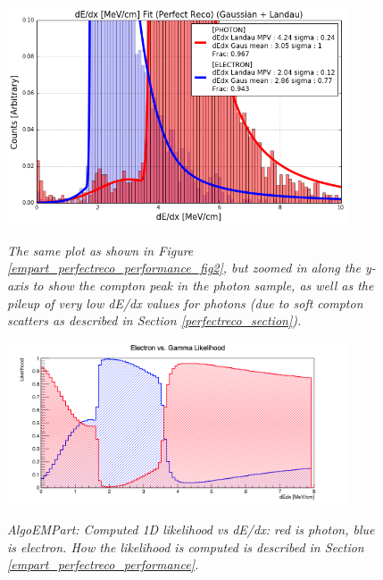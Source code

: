 \begin{figure}[ht!]
\centering
\includegraphics[width=0.9\textwidth]{Figures/EMPartTraining/mc_trained/dEdx_Selected_both_zoomed.png}\\
\caption{\textit{The same plot as shown in Figure \ref{empart_perfectreco_performance_fig2}, but zoomed in along the y-axis to show the compton peak in the photon sample, as well as the pileup of very low dE/dx values for photons (due to soft compton scatters as described in Section \ref{perfectreco_section}).}}
\label{empart_perfectreco_performance_fig3}
\end{figure}

\begin{figure}[ht!]
\centering
\includegraphics[width=0.9\textwidth]{Figures/EMPartTraining/mc_trained/Likelihood_dEdx.png}\\
\caption{\textit{AlgoEMPart: Computed 1D likelihood vs dE/dx: red is photon, blue is electron. How the likelihood is computed is described in Section \ref{empart_perfectreco_performance}.}}
\label{empart_perfectreco_performance_fig4}
\end{figure}


